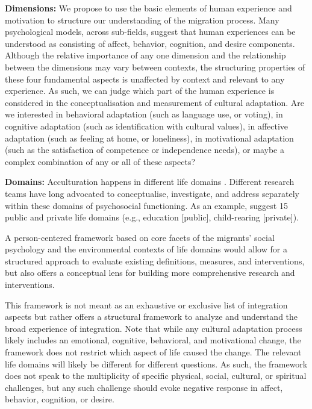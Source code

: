 \documentclass[man, 12pt, a4paper]{apa7}
\begin{document}
\textbf{Dimensions:} We propose to use the basic elements of human experience and motivation to structure our understanding of the migration process. Many psychological models, across sub-fields, suggest that human experiences can be understood as consisting of affect, behavior, cognition, and desire components. Although the relative importance of any one dimension and the relationship between the dimensions may vary between contexts, the structuring properties of these four fundamental aspects is unaffected by context and relevant to any experience. As such, we can judge which part of the human experience is considered in the conceptualisation and measurement of cultural adaptation. Are we interested in behavioral adaptation (such as language use, or voting), in cognitive adaptation (such as identification with cultural values), in affective adaptation (such as feeling at home, or loneliness), in motivational adaptation (such as the satisfaction of competence or independence needs), or maybe a complex combination of any or all of these aspects?

\textbf{Domains:} Acculturation happens in different life domains \citep{Arends-Toth2006, Arends-Toth2007, Zane2004}. Different research teams have long advocated to conceptualise, investigate, and address separately within these domains of psychosocial functioning. As an example, \citet{Arends-Toth2006, Arends-Toth2007} suggest 15 public and private life domains (e.g., education [public], child-rearing [private]).

A person-centered framework based on core facets of the migrants’ social psychology and the environmental contexts of life domains would allow for a structured approach to evaluate existing definitions, measures, and interventions, but also offers a conceptual lens for building more comprehensive research and interventions.

This framework is not meant as an exhaustive or exclusive list of integration aspects but rather offers a structural framework to analyze and understand the broad experience of integration. Note that while any cultural adaptation process likely includes an emotional, cognitive, behavioral, and motivational change, the framework does not restrict which aspect of life caused the change. The relevant life domains will likely be different for different questions. As such, the framework does not speak to the multiplicity of specific physical, social, cultural, or spiritual challenges, but any such challenge should evoke negative response in affect, behavior, cognition, or desire.
\end{document}
